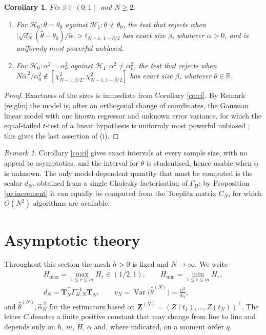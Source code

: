\documentclass[11pt,reqno]{amsart}
\numberwithin{equation}{section}
\theoremstyle{plain}
\newtheorem{corollary}[theorem]{Corollary}
\theoremstyle{definition}
\theoremstyle{remark}
\newtheorem{remark}[theorem]{Remark}
\newcommand{\bT}{\mathbf{T}}
\newcommand{\bZ}{\mathbf{Z}}
\newcommand{\GH}{\Gamma_H}
\newcommand{\Hmax}{H_{\max}}
\newcommand{\Hmin}{H_{\min}}
\newcommand{\R}{\mathbb{R}}
\DeclareMathOperator{\Var}{Var}
\begin{document}
\begin{corollary}\label{co:tests}
Fix $\beta\in(0,1)$ and $N\ge2$.
\begin{enumerate}[label=\textup{(\roman*)}]
\item For $\mathcal H_0:\theta=\theta_0$ against $\mathcal H_1:\theta\ne\theta_0$, the
      test that rejects when
      $\bigl|\sqrt{d_N}(\widehat\theta-\theta_0)/\widetilde\alpha\bigr|
      >t_{N-1,\,1-\beta/2}$ has exact size $\beta$, whatever $\alpha>0$, and is uniformly
      most powerful unbiased.
\item For $\mathcal H_0:\alpha^{2}=\alpha_0^{2}$ against
      $\mathcal H_1:\alpha^{2}\ne\alpha_0^{2}$, the test that rejects when
      $N\widehat\alpha^{\,2}/\alpha_0^{2}\notin
      [\chi^{2}_{N-1,\beta/2},\chi^{2}_{N-1,1-\beta/2}]$ has exact size $\beta$, whatever
      $\theta\in\R$.
\end{enumerate}
\end{corollary}

\begin{proof}
Exactness of the sizes is immediate from Corollary \ref{co:ci}. By Remark \ref{re:glm}
the model is, after an orthogonal change of coordinates, the Gaussian linear model with
one known regressor and unknown error variance, for which the equal-tailed $t$-test of a
linear hypothesis is uniformly most powerful unbiased
\cite[Ch.~5 and Sec.~7.1]{LR05}; this gives the last assertion of (i).
\end{proof}

\begin{remark}\label{re:cicomment}
Corollary \ref{co:ci} gives exact intervals at every sample size, with no appeal to
asymptotics, and the interval for $\theta$ is studentised, hence usable when $\alpha$ is
unknown. The only model-dependent quantity that must be computed is the scalar $d_N$,
obtained from a single Cholesky factorisation of $\GH$; by
Proposition \ref{pr:increment} it can equally be computed from the Toeplitz matrix
$C_N$, for which $O(N^{2})$ algorithms are available.
\end{remark}

\section{Asymptotic theory}\label{se:asymp}

Throughout this section the mesh $h>0$ is fixed and $N\to\infty$. We write
\[
\begin{gathered}
  \Hmax=\max_{1\le r\le m}H_r\in(1/2,1),\qquad
  \Hmin=\min_{1\le r\le m}H_r,\\[2pt]
  d_N=\bT_N^{\top}\Gamma_{H,N}^{-1}\bT_N,\qquad
  v_N=\Var\bigl(\widehat\theta^{(N)}\bigr)=\frac{\alpha^{2}}{d_N},
\end{gathered}
\]
and $\widehat\theta^{(N)},\widehat\alpha^{\,2}_N$ for the estimators based on
$\bZ^{(N)}=(Z(t_1),\dots,Z(t_N))^{\top}$. The letter $C$ denotes a finite positive
constant that may change from line to line and depends only on $h$, $m$, $H$, $\alpha$
and, where indicated, on a moment order $q$.
\end{document}
